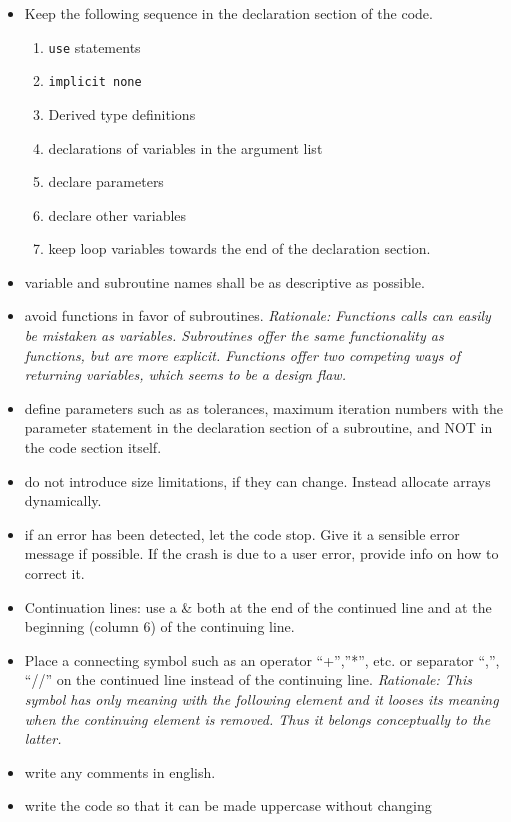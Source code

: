 \documentclass[11pt,a4paper]{report}
\begin{document}
\begin{itemize}
\begin{verbatim}
\end{verbatim}
%
\item Keep the following sequence in the declaration section of the
  code.
  \begin{enumerate}
     \item \verb|use| statements
     \item \verb|implicit none|
     \item Derived type definitions
     \item declarations of variables in the argument list
     \item declare parameters
     \item declare other variables
     \item keep loop variables towards the end of the declaration
       section. 
  \end{enumerate}
%
\item variable and subroutine names shall be as descriptive as
  possible.
%
\item avoid functions in favor of subroutines. \textit{Rationale:
  Functions calls can easily be mistaken as variables. Subroutines
  offer the same functionality as functions, but are more
  explicit. Functions offer two competing ways of returning variables,
  which seems to be a design flaw.}
%
\item define parameters such as as tolerances, maximum iteration
  numbers with the parameter statement in the declaration section of a
  subroutine, and NOT in the code section itself.
%
\item do not introduce size limitations, if they can change. Instead
  allocate arrays dynamically.
%
\item if an error has been detected, let the code stop. Give it a
 sensible error message if possible. If the crash is due to a user
 error, provide info on how to correct it.
%
\item Continuation lines: use a \& both at the end of the continued
 line and at the beginning (column 6) of the continuing line.
%
\item Place a connecting symbol such as an operator ``+'',''*'',
  etc. or separator ``,'', ``//'' on the continued line instead of the
  continuing line. \textit{Rationale: This symbol has only meaning
    with the following element and it looses its meaning when the
    continuing element is removed. Thus it belongs conceptually to the
    latter.}
%
\item write any comments in english.
%
\item write the code so that it can be made uppercase without changing

\end{itemize}
\end{document}
